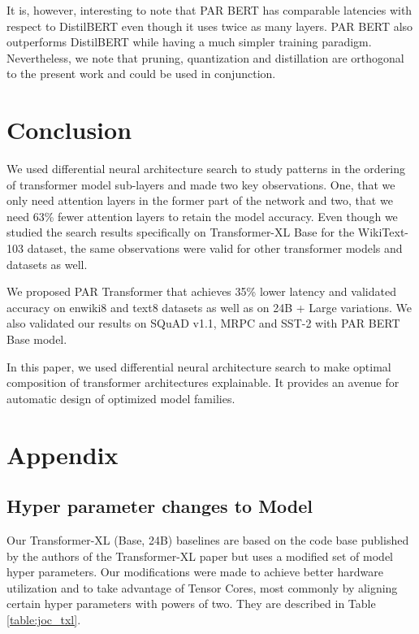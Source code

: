 \documentclass[11pt]{article}
\begin{document}
It is, however, interesting to note that PAR BERT has comparable latencies with respect to DistilBERT even though it uses twice as many layers. PAR BERT also outperforms DistilBERT while having a much simpler training paradigm. Nevertheless, we note that pruning, quantization and distillation are orthogonal to the present work and could be used in conjunction.

\section{Conclusion}

We used differential neural architecture search to study patterns in the ordering of transformer model sub-layers and made two key observations. One, that we only need attention layers in the former part of the network and two, that we need 63\% fewer attention layers to retain the model accuracy. Even though we studied the search results specifically on Transformer-XL Base for the WikiText-103 dataset, the same observations were valid for other transformer models and datasets as well. 

We proposed PAR Transformer that achieves 35\% lower latency and validated accuracy on enwiki8 and text8 datasets as well as on 24B + Large variations. We also validated our results on SQuAD v1.1, MRPC and SST-2 with PAR BERT Base model. 

In this paper, we used differential neural architecture search to make optimal composition of transformer architectures explainable. It provides an avenue for automatic design of optimized model families.

\nocite{*}



\appendix
\section{Appendix}
\setcounter{table}{0}
\renewcommand{\thetable}{A\arabic{table}}
\subsection{Hyper parameter changes to Model}

Our Transformer-XL (Base, 24B) baselines are based on the code base published by the authors of the Transformer-XL paper but uses a modified set of model hyper parameters. Our modifications were made to achieve better hardware utilization and to take advantage of Tensor Cores, most commonly by aligning certain hyper parameters with powers of two. They are described in Table \ref{table:joc_txl}. 
\end{document}
